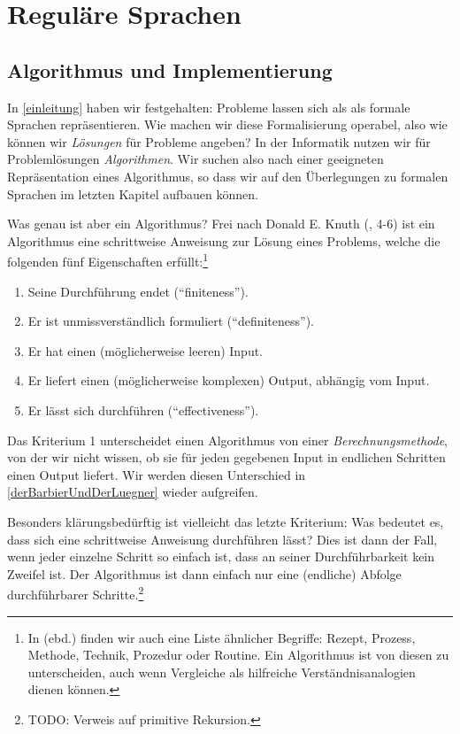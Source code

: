 \chapter{Reguläre Sprachen}

\section{Algorithmus und Implementierung}

In \autoref{einleitung} haben wir festgehalten:
Probleme lassen sich als als formale Sprachen repräsentieren.
Wie machen wir diese Formalisierung operabel,
also wie können wir \emph{Lösungen} für Probleme angeben?
In der Informatik nutzen wir für Problemlösungen \emph{Algorithmen}.
Wir suchen also nach einer geeigneten Repräsentation eines Algorithmus,
so dass wir auf den Überlegungen zu formalen Sprachen im letzten Kapitel aufbauen können.

Was genau ist aber ein Algorithmus?
Frei nach Donald E. Knuth (\cite{knuth1}, 4-6)
ist ein Algorithmus eine schrittweise Anweisung zur Lösung eines Problems,
welche die folgenden fünf Eigenschaften erfüllt:\footnote{
    In \cite{knuth1} (ebd.) finden wir auch eine Liste ähnlicher Begriffe:
    Rezept, Prozess, Methode, Technik, Prozedur oder Routine.
    Ein Algorithmus ist von diesen zu unterscheiden,
    auch wenn Vergleiche als hilfreiche Verständnisanalogien dienen können.
}
\begin{enumerate}
    \item Seine Durchführung endet (``finiteness'').
    \item Er ist unmissverständlich formuliert (``definiteness'').
    \item Er hat einen (möglicherweise leeren) Input.
    \item Er liefert einen (möglicherweise komplexen) Output, abhängig vom Input.
    \item Er lässt sich durchführen (``effectiveness'').
\end{enumerate}

Das Kriterium 1 unterscheidet einen Algorithmus von einer \emph{Berechnungsmethode},
von der wir nicht wissen,
ob sie für jeden gegebenen Input in endlichen Schritten einen Output liefert.
Wir werden diesen Unterschied in \autoref{derBarbierUndDerLuegner} wieder aufgreifen.

Besonders klärungsbedürftig ist vielleicht das letzte Kriterium:
Was bedeutet es, dass sich eine schrittweise Anweisung durchführen lässt?
Dies ist dann der Fall, wenn jeder einzelne Schritt so einfach ist,
dass an seiner Durchführbarkeit kein Zweifel ist.
Der Algorithmus ist dann einfach nur eine (endliche)
Abfolge durchführbarer Schritte.\footnote{TODO: Verweis auf primitive Rekursion.}


